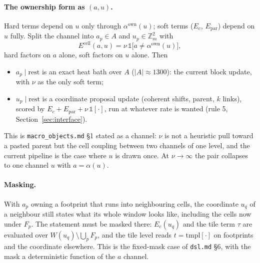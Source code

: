 \documentclass[11pt]{article}
\newcommand{\Z}{\mathbb{Z}}
\newcommand{\1}{\mathds{1}}
\begin{document}
\paragraph{The ownership form as $(a, u)$.} Hard terms depend on $u$ only
through $\alpha^{\mathrm{own}}(u)$; soft terms ($E_c$, $E_{\mathrm{par}}$) depend on
$u$ fully. Split the channel into $a_p \in A$ and $u_p \in \Z_m^2$ with
\[
  E^{\mathrm{cell}}(a, u) = \nu\,\1\big[a \ne \alpha^{\mathrm{own}}(u)\big],
\]
hard factors on $a$ alone, soft factors on $u$ alone. Then
\begin{itemize}
  \item $a_p \mid \text{rest}$ is an exact heat bath over $A$ ($|A| \approx 1300$):
        the current block update, with $\nu$ as the only soft term;
  \item $u_p \mid \text{rest}$ is a coordinate proposal update (coherent shifts,
        parent, $k$ links), scored by $E_c + E_{\mathrm{par}} + \nu\,\1[\cdot]$, run at
        whatever rate is wanted (rule 5, Section~\ref{sec:interface}).
\end{itemize}
This is \texttt{macro\_objects.md} \S1 stated as a channel: $\nu$ is not a
heuristic pull toward a pasted parent but the cell coupling between two channels
of one level, and the current pipeline is the case where $u$ is drawn once. At
$\nu \to \infty$ the pair collapses to one channel $u$ with $a = \alpha(u)$.

\paragraph{Masking.} With $a_p$ owning a footprint that runs into neighbouring
cells, the coordinate $u_q$ of a neighbour still states what its whole window
looks like, including the cells now under $F_p$. The statement must be masked
there: $E_c(u_q)$ and the tile term $\tau$ are evaluated over
$W(u_q) \setminus \bigcup_{p} F_p$, and the tile level reads $t = \mathrm{tmpl}[\cdot]$
on footprints and the coordinate elsewhere. This is the fixed-mask case of
\texttt{dsl.md} \S6, with the mask a deterministic function of the $a$ channel.
\end{document}
